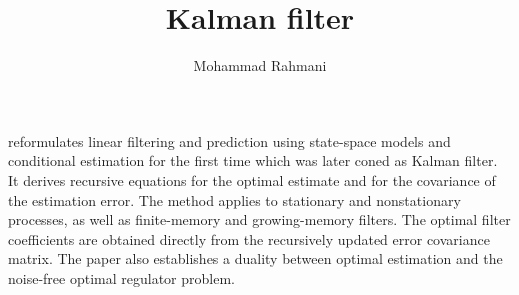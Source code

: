 \documentclass[a4paper]{article}
\title{Kalman filter}
\date{}
\author{Mohammad Rahmani}
\begin{document}
    \maketitle
    \cite{kalman-1960-a-new-approach-to-linear-filtering-and-prediction-problems} reformulates linear filtering and prediction using state-space models and conditional estimation for the first time which was later coned as Kalman filter.
    It derives recursive equations for the optimal estimate and for the covariance of the estimation error.
    The method applies to stationary and nonstationary processes, as well as finite-memory and growing-memory filters.
    The optimal filter coefficients are obtained directly from the recursively updated error covariance matrix.
    The paper also establishes a duality between optimal estimation and the noise-free optimal regulator problem.
    
    
\end{document}
